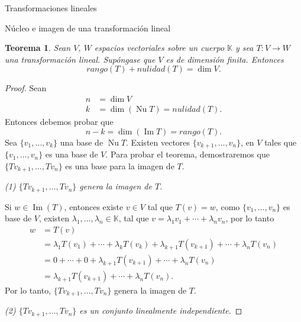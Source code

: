 \documentclass[a4paper,12pt,twoside,spanish]{amsbook}
\newtheorem{teorema}{Teorema}[section]
\theoremstyle{definition}
\theoremstyle{remark}
\newcommand{\img}{\operatorname{Im}}
\newcommand{\nuc}{\operatorname{Nu}}
\newcommand{\K}{\mathbb K}
\begin{document}
\begin{chapter}{Transformaciones lineales}
\begin{section}{Núcleo e imagen de una transformación lineal}
		\begin{teorema}\label{rang+nul=dimV}
			 	Sean $V$, $W$ espacios vectoriales sobre un cuerpo $\K$ y sea $T:V \to W$ una transformación lineal. Supóngase que $V$ es de dimensión finita. Entonces 
			 	$$
			 	rango (T) + nulidad (T) = \dim V.
			 	$$
		\end{teorema}
		\begin{proof} Sean 
			\begin{align*}
				n &= \dim V \\
				k &= \dim(\nuc T) = nulidad(T).  
			\end{align*}
			Entonces debemos probar  que 
			$$
			n-k = \dim(\img T) = rango(T).
			$$
		 	Sea $\{v_1,\ldots,v_k \}$ una base de $\nuc T$. Existen vectores $\{v_{k+1},\ldots,v_n \}$, en $V$ tales que $\{v_1,\ldots,v_n \}$ es una base de $V$. Para probar el teorema, demostraremos que 
		 	$\{Tv_{k+1},\ldots,Tv_n \}$ es una base para la imagen de $T$. 
		 	
		 	 \textit{(1) $\{Tv_{k+1},\ldots,Tv_n \}$ genera la imagen de $T$.} 
		 	 
		 	 Si $w \in \img(T)$,  entonces existe $v \in V$ tal que $T(v)=w$, como $\{v_{1},\ldots,v_n \}$ es base de $V$,  existen $\lambda_1,\ldots,\lambda_{n} \in \K$,  tal que $v=  \lambda_1 v_1+ \cdots + \lambda_n v_n$, por lo tanto 
		 	\begin{align*}
		 		w &= T(v) \\ 
		 		&=  \lambda_1T( v_1)+ \cdots + \lambda_kT( v_k)+ \lambda_{k+1}T( v_{k+1}) +\cdots+ \lambda_nT( v_n) \\
		 		&=  0+ \cdots + 0+ \lambda_{k+1}T( v_{k+1}) +\cdots+ \lambda_nT( v_n) \\
		 		&=  \lambda_{k+1}T( v_{k+1}) +\cdots+ \lambda_nT( v_n).
		 	\end{align*}
		 	Por  lo tanto, $\{Tv_{k+1},\ldots,Tv_n \}$ genera la imagen de $T$. 
		 	
		 	\textit{(2) $\{Tv_{k+1},\ldots,Tv_n \}$ es un conjunto linealmente independiente.}
		 	

\end{proof}
\end{section}
\end{chapter}
\end{document}
